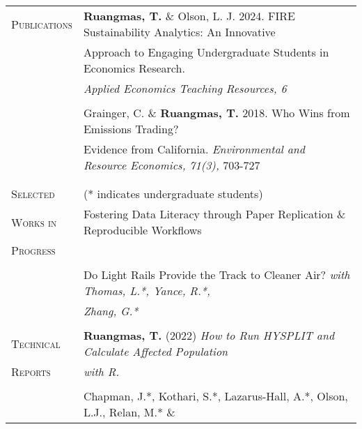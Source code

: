 \documentclass[letterpaper,11pt,oneside]{article}\usepackage[]{graphicx}\usepackage[]{xcolor}
\begin{document}
\noindent \begin{tabular}{p{1.2in} l}
\textsc{Publications}   & \textbf{Ruangmas, T.} \& Olson, L. J. 2024. FIRE Sustainability Analytics: An Innovative \\
				                & Approach to Engaging Undergraduate Students in Economics Research. \\
				                & \textit{Applied Economics Teaching Resources, 6} \href{https://www.aetrjournal.org/advance-access/special-issue-on-undergraduate-research-in-agricultural-and-applied-economics/fire-sustainability-analytics-an-innovative-approach-to-engaging-undergraduate-students-in-economics-research}{\color{blue}{[LINK]}} \\
	                      & \\  
                        & Grainger, C. \& \textbf{Ruangmas, T.} 2018. Who Wins from Emissions Trading? \\
				                & Evidence from California. \textit{Environmental and Resource Economics, 71(3),} 703-727 \\
				                & \href{https://doi.org/10.1007/s10640-017-0180-1}{\color{blue}{https://doi.org/10.1007/s10640-017-0180-1}} \\
				                & \\   
\textsc{Selected} & (* indicates undergraduate students) \\
\textsc{Works in} & Fostering Data Literacy through Paper Replication \& Reproducible Workflows \\
\textsc{Progress} & \href{https://drive.google.com/file/d/1fRY17-CxsH2L_wNmxx7SN8mxS3uf7Bmg/view?usp=drive_link}{\color{blue}{[LINK]}} \\
	                & \\
	                & Do Light Rails Provide the Track to Cleaner Air? \textit{with Thomas, L.*, Yance, R.*,} \\
	                & \textit{Zhang, G.*} \\
                  & \\
\textsc{Technical} & \textbf{Ruangmas, T.} (2022) \textit{How to Run HYSPLIT and Calculate Affected Population} \\
\textsc{Reports}   & \textit{with R.} \href{https://ruangmas.github.io/hysplit.html}{\color{blue}{[LINK]}} \\
                    & \\
                        & Chapman, J.*, Kothari, S.*, Lazarus-Hall, A.*, Olson, L.J., Relan, M.* \& \\

\end{tabular}
\end{document}
